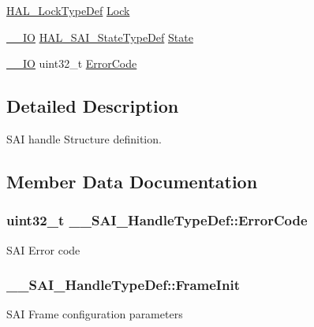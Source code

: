 \begin{DoxyCompactItemize}
\item 
\hyperlink{stm32f4xx__hal__def_8h_ab367482e943333a1299294eadaad284b}{H\+A\+L\+\_\+\+Lock\+Type\+Def} \hyperlink{struct_____s_a_i___handle_type_def_a0618c6ee0d6f7d735bf33619aeffbd30}{Lock}
\item 
\hyperlink{core__sc300_8h_aec43007d9998a0a0e01faede4133d6be}{\+\_\+\+\_\+\+IO} \hyperlink{group___s_a_i___exported___types_gac758df9679f0ee29c77d9b1b66289589}{H\+A\+L\+\_\+\+S\+A\+I\+\_\+\+State\+Type\+Def} \hyperlink{struct_____s_a_i___handle_type_def_a89c4679bb5c61aea9b747791a7ec5a5b}{State}
\item 
\hyperlink{core__sc300_8h_aec43007d9998a0a0e01faede4133d6be}{\+\_\+\+\_\+\+IO} uint32\+\_\+t \hyperlink{struct_____s_a_i___handle_type_def_a3fd57adcd0e53202b3339e35e50a00df}{Error\+Code}
\end{DoxyCompactItemize}


\subsection{Detailed Description}
S\+AI handle Structure definition. 

\subsection{Member Data Documentation}
\subsubsection[{\texorpdfstring{Error\+Code}{ErrorCode}}]{ uint32\+\_\+t \+\_\+\+\_\+\+S\+A\+I\+\_\+\+Handle\+Type\+Def\+::\+Error\+Code}\hypertarget{struct_____s_a_i___handle_type_def_a3fd57adcd0e53202b3339e35e50a00df}{}\label{struct_____s_a_i___handle_type_def_a3fd57adcd0e53202b3339e35e50a00df}
S\+AI Error code 
\subsubsection[{\texorpdfstring{Frame\+Init}{FrameInit}}]{ \+\_\+\+\_\+\+S\+A\+I\+\_\+\+Handle\+Type\+Def\+::\+Frame\+Init}\hypertarget{struct_____s_a_i___handle_type_def_a2942d66875489996442c31fb646ff701}{}\label{struct_____s_a_i___handle_type_def_a2942d66875489996442c31fb646ff701}
S\+AI Frame configuration parameters 

